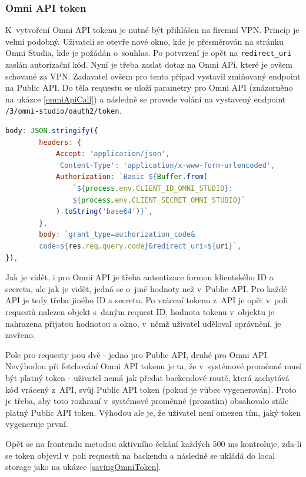 \documentclass[czech, bc, kiv, he, iso690numb]{fasthesis}
\begin{document}
\subsubsection{Omni API token}
K~vytvoření Omni API tokenu je nutné být přihlášen na firemní VPN. Princip je velmi podobný. Uživateli se otevře nové okno, kde je přesměrován na stránku Omni Studia, kde je požádán
o~souhlas. Po potvrzení je opět na \texttt{redirect\_uri} zaslán autorizační kód. Nyní je třeba zaslat dotaz na Omni APi, které je ovšem schované za VPN. Zadavatel ovšem pro tento případ
vystavil zmiňovaný endpoint na Public API. Do těla requestu se uloží parametry pro Omni API (znázorněno na ukázce \ref{omniApiCall}) a následně se provede volání na vystavený endpoint
\texttt{/3/omni-studio/oauth2/token}. 

\begin{lstlisting}[language=Javascript, caption={Parametry pro Omni API}, label=omniApiCall]
body: JSON.stringify({
		headers: {
			Accept: 'application/json',
			'Content-Type': 'application/x-www-form-urlencoded',
			Authorization: `Basic ${Buffer.from(
				`${process.env.CLIENT_ID_OMNI_STUDIO}:
				${process.env.CLIENT_SECRET_OMNI_STUDIO}`
			).toString('base64')}`,
		},
		body: `grant_type=authorization_code&
		code=${res.req.query.code}&redirect_uri=${uri}`,
}),
\end{lstlisting}

Jak je vidět, i pro Omni API je třeba autentizace formou klientského ID a secretu, ale jak je vidět, jedná se o~jiné hodnoty než v~Public API. Pro každé API
je tedy třeba jiného ID a secretu. Po vrácení tokenu z~API je opět v~poli requestů nalezen objekt s~daným request ID, hodnota tokenu v~objektu je nahrazena přijatou hodnotou a okno, v~němž
uživatel uděloval oprávnění, je zavřeno. 

Pole pro requesty jsou dvě - jedno pro Public API, druhé pro Omni API. Nevýhodou při fetchování Omni API tokenu je ta, že v~systémové proměnné musí být platný token - uživatel nemá jak předat
backendové routě, která zachytává kód vrácený z~API, svůj Public API token (pokud je vůbec vygenerován). Proto je třeba, aby toto rozhraní v~systémové proměnné (prozatím) obsahovalo stále platný 
Public API token. Výhodou ale je, že uživatel není omezen tím, jaký token vygeneruje první.

Opět se na frontendu metodou aktivního čekání každých 500 ms kontroluje, zda-li se token objevil v~poli requestů na backendu a následně se ukládá do local storage jako na ukázce
\ref{savingOmniToken}.
\end{document}
